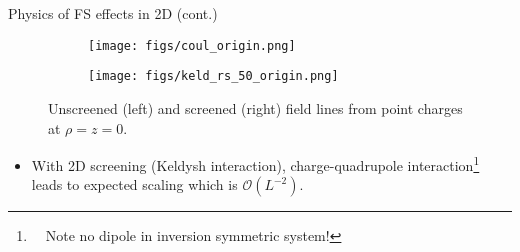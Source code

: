 \documentclass[10pt, pdf, hyperref={draft}, usenames, dvipsnames]{beamer}
\begin{document}
\begin{frame}{Physics of FS effects in 2D (cont.)}
\begin{figure}[H]
\centering
\begin{subfigure}{.5\textwidth}
  \centering
  \texttt{[image: figs/coul\_origin.png]}
  \label{fig:sub1}
\end{subfigure}%
\begin{subfigure}{.5\textwidth}
  \centering
  \texttt{[image: figs/keld\_rs\_50\_origin.png]}
  \label{fig:sub2}
\end{subfigure}
\vspace{-1cm}
\caption{Unscreened (left) and screened (right) field lines from point charges at $\rho=z=0$.}
\label{fig:field_lines}
\end{figure}
\vspace{-.3cm}
\begin{itemize}
  \item With 2D screening (Keldysh interaction), charge-quadrupole
  interaction\footnote{~~Note no dipole in inversion symmetric system!} leads to
  expected scaling which is $\mathcal{O}(L^{-2})$.%
\end{itemize}
\end{frame}

%
%
\end{document}
